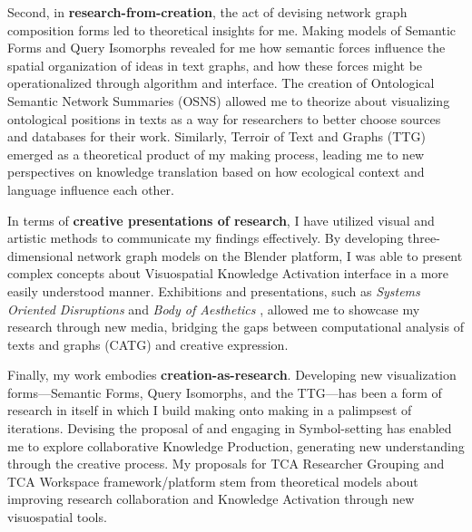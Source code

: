 Second, in \textbf{research-from-creation}, the act of devising network graph composition forms led to theoretical insights for me. Making models of Semantic Forms and Query Isomorphs revealed for me how semantic forces influence the spatial organization of ideas in text graphs, and how these forces might be operationalized through algorithm and interface. The creation of Ontological Semantic Network Summaries (OSNS) allowed me to theorize about visualizing ontological positions in texts as a way for researchers to better choose sources and databases for their work. Similarly, Terroir of Text and Graphs (TTG) emerged as a theoretical product of my making process, leading me to new perspectives on knowledge translation based on how ecological context and language influence each other.
\noindent{}    

In terms of \textbf{creative presentations of research}, I have utilized visual and artistic methods to communicate my findings effectively. By developing three-dimensional network graph models on the Blender platform, I was able to present complex concepts about Visuospatial Knowledge Activation interface in a more easily understood manner.  Exhibitions and presentations, such as \textit{Systems Oriented Disruptions} \citep{castano-suarez_systems_2024} and \textit{Body of Aesthetics} \citep{dagovic_body_2024,the_gallery_at_mason_studio_body_2024},  allowed me to showcase my research through new media, bridging the gaps between computational analysis of texts and graphs (CATG) and creative expression.
\noindent{}  

Finally, my work embodies \textbf{creation-as-research}. Developing new visualization forms—Semantic Forms, Query Isomorphs, and the TTG—has been a form of research in itself in which I build making onto making in a palimpsest of iterations. Devising the proposal of and engaging in Symbol-setting has enabled me to explore collaborative Knowledge Production, generating new understanding through the creative process. My proposals for TCA Researcher Grouping and TCA Workspace framework/platform stem from theoretical models about improving research collaboration and Knowledge Activation through new visuospatial tools.
\noindent{}     

